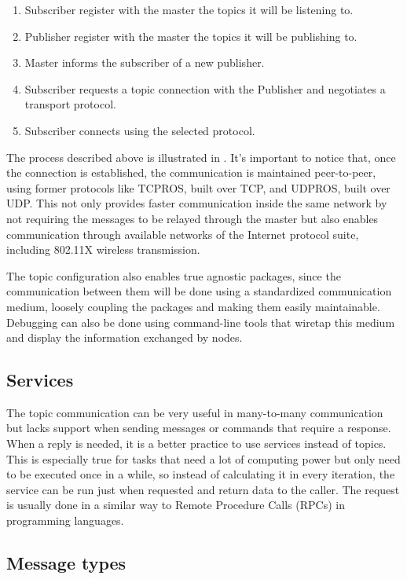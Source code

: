 \begin{enumerate}
\item Subscriber register with the master the topics it will be listening to.
\item Publisher register with the master the topics it will be publishing to.
\item Master informs the subscriber of a new publisher.
\item Subscriber requests a topic connection with the Publisher and negotiates a transport protocol.
\item Subscriber connects using the selected protocol.
\end{enumerate}

The process described above is illustrated in . It's important to notice that, once the connection is established, the communication is maintained peer-to-peer, using former protocols like TCPROS, built over TCP, and UDPROS, built over UDP. This not only provides faster communication inside the same network by not requiring the messages to be relayed through the master but also enables communication through available networks of the Internet protocol suite, including 802.11X wireless transmission.

The topic configuration also enables true agnostic packages, since the communication between them will be done using a standardized communication medium, loosely coupling the packages and making them easily maintainable. Debugging can also be done using command-line tools that wiretap this medium and display the information exchanged by nodes.

\subsection{Services}

The topic communication can be very useful in many-to-many communication but lacks support when sending messages or commands that require a response. When a reply is needed, it is a better practice to use services instead of topics. This is especially true for tasks that need a lot of computing power but only need to be executed once in a while, so instead of calculating it in every iteration, the service can be run just when requested and return data to the caller. The request is usually done in a similar way to Remote Procedure Calls (RPCs) in programming languages.

\subsection{Message types}

